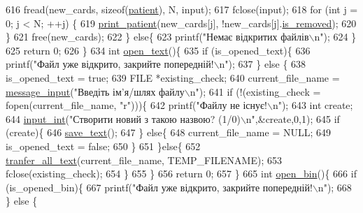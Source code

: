 \begin{DoxyCodeInclude}
{{{{{616         fread(new\_cards, \textcolor{keyword}{sizeof}(\hyperlink{structpatient__struct}{patient}), N, input);
617         fclose(input);
618         \textcolor{keywordflow}{for} (\textcolor{keywordtype}{int} j = 0; j < N; ++j) \{
619             \hyperlink{main_8c_abbf86d13b1ad7b2b758cea501fa0261a}{print\_patient}(new\_cards[j], !new\_cards[j].\hyperlink{structpatient__struct_ad2475b69abfa9243c2700d63b63aa79b}{is\_removed});
620         \}
621         free(new\_cards);
622     \} \textcolor{keywordflow}{else}\{
623         printf(\textcolor{stringliteral}{"Немає відкритих файлів\(\backslash\)n"});
624     \}
625     \textcolor{keywordflow}{return} 0;
626 \}
634 \textcolor{keywordtype}{int} \hyperlink{main_8c_a32a9d4e3cad93887f3e4a6e3a3f37828}{open\_text}()\{
635     \textcolor{keywordflow}{if} (is\_opened\_text)\{
636         printf(\textcolor{stringliteral}{"Файл уже відкрито, закрийте попередній!\(\backslash\)n"});
637     \} \textcolor{keywordflow}{else} \{
638         is\_opened\_text = \textcolor{keyword}{true};
639         FILE *existing\_check;
640         current\_file\_name = \hyperlink{lab__functions_8h_a53c0a255092a68903d4627229c37d7d0}{message\_input}(\textcolor{stringliteral}{"Введіть ім'я/шлях файлу\(\backslash\)n"});
641         \textcolor{keywordflow}{if} (!(existing\_check = fopen(current\_file\_name, \textcolor{stringliteral}{"r"})))\{
642             printf(\textcolor{stringliteral}{"Файлу не існує!\(\backslash\)n"});
643             \textcolor{keywordtype}{int} create;
644             \hyperlink{lab__functions_8h_a6f453bc035d85e967bd5032eca31a155}{input\_int}(\textcolor{stringliteral}{"Створити новий з такою назвою? (1/0)\(\backslash\)n"},&create,0,1);
645             \textcolor{keywordflow}{if} (create)\{
646                 \hyperlink{main_8c_adcaf3a4fe6a5d1223e9d28382d74c8fe}{save\_text}();
647             \} \textcolor{keywordflow}{else}\{
648                 current\_file\_name = NULL;
649                 is\_opened\_text = \textcolor{keyword}{false};
650             \}
651         \}\textcolor{keywordflow}{else}\{
652             \hyperlink{main_8c_a2d8c16830ee01715bd19345746ffb070}{tranfer\_all\_text}(current\_file\_name, TEMP\_FILENAME);
653             fclose(existing\_check);
654         \}
655     \}
656     \textcolor{keywordflow}{return} 0;
657 \}
665 \textcolor{keywordtype}{int} \hyperlink{main_8c_a285aac9c388f14bbb9cfc7e2e6714169}{open\_bin}()\{
666     \textcolor{keywordflow}{if} (is\_opened\_bin)\{
667         printf(\textcolor{stringliteral}{"Файл уже відкрито, закрийте попередній!\(\backslash\)n"});
668     \} \textcolor{keywordflow}{else} \{
}}}}}
\end{DoxyCodeInclude}

